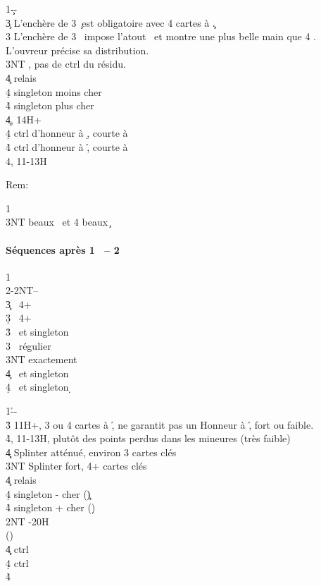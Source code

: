 \documentclass[a4paper]{article}
\begin{document}
\begin{bidtable}
1\c--\\
3\c \> L’enchère de 3 \c\ est obligatoire avec 4 cartes à \c .\+\\
3\s \> L’enchère de 3 \s\ impose l’atout \s\ et montre une plus belle main que 4 \s .\\
\>L’ouvreur précise sa distribution.\+\\
3NT , pas de ctrl du résidu.\+\\
4\c \> relais\+\\
4\d \> singleton moins cher\\
4\h \> singleton plus cher\-\-\\
4\c {}, 14H+\\
4\d \> ctrl d’honneur à \d , courte à \h \\
4\h \> ctrl d’honneur à \h , courte à \d \\
4\s {}, 11-13H\-\-
\end{bidtable}

Rem:

\begin{bidtable}
1\c\\
3NT  beaux \s\ et 4 beaux \c 
\end{bidtable}

\paragraph{Séquences après 1 \pdfs\ – 2 \pdfh}

\begin{bidtable}
1\h\\
2\s-2NT--\\
3\c {} \s\ 4+ \c \\
3\d {} \s\ 4+ \d \\
3\h {} \s\ et singleton \h \\
3\s {} \s\ régulier\\
3NT  exactement\\
4\c {} \s\ et singleton \c \\
4\d {} \s\ et singleton \d 
\end{bidtable}

\begin{bidtable}
1\h--\\
3\h \> 11H+, 3 ou 4 cartes à \h , ne garantit pas un Honneur à \h , fort ou faible.\\
4\h {}, 11-13H, plutôt des points perdus dans les mineures (très faible)\\
4\c\d \> Splinter atténué, environ 3 cartes clés\\
3NT \> Splinter fort, 4+ cartes clés\+\\
4\c \> relais\+\\
4\d \> singleton - cher (\c )\\
4\h \> singleton + cher (\d )\-\-\\
2NT -20H\+\\
()\+\\
4\c\d {} ctrl \c \\
4\d {} ctrl \d \\
4\h {}\-\-
\end{bidtable}
\end{document}
